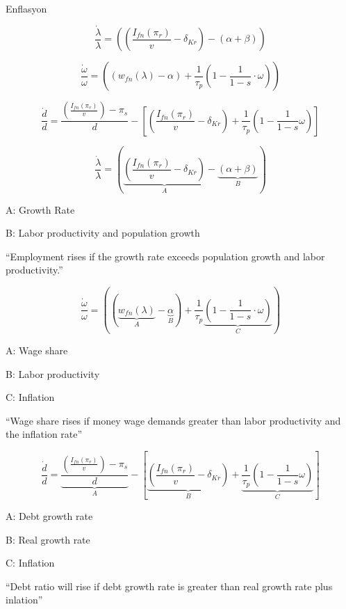 \documentclass[12pt,fleqn]{article}\usepackage{../../common}
\begin{document}
Enflasyon


$$ 
\frac{\dot{\lambda}}{\lambda} =
\left( 
  \left( \frac{I_{fn}(\pi_r)}{v}  - \delta_{Kr} \right) -
  (\alpha + \beta)
\right)
$$

$$ 
\frac{\dot{\omega}}{\omega} = 
\left( 
(w_{fn}(\lambda) - \alpha) + \frac{1}{\tau_p} \left( 1-\frac{1}{1-s} \cdot \omega\right)
\right)
$$


$$ 
\frac{\dot{d}}{d} = 
\frac{\left( \frac{I_{fn}(\pi_r)}{v} \right) - \pi_s }{d} - 
\left[ 
\left( \frac{I_{fn}(\pi_r)}{v} -\delta_{Kr} \right) + 
\frac{1}{\tau_p} \left(1 - \frac{1}{1-s} \omega\right)
\right]
$$





\newpage









$$ 
\frac{\dot{\lambda}}{\lambda} =
\left( 
  \underbrace{ \left( \frac{I_{fn}(\pi_r)}{v}  - \delta_{Kr} \right)}_{A} - 
  \underbrace{ (\alpha + \beta) }_{B}
\right)
$$

A: Growth Rate

B: Labor productivity and population growth

``Employment rises if the growth rate exceeds population growth and labor productivity.''


$$ 
\frac{\dot{\omega}}{\omega} = 
\left( 
(\underbrace{w_{fn}(\lambda)}_{A} - \underbrace{\alpha}_{B}) + \frac{1}{\tau_p}
\underbrace{\left( 1-\frac{1}{1-s} \cdot \omega \right)}_{C}
\right)
$$

A: Wage share 

B: Labor productivity

C: Inflation

``Wage share rises if money wage demands greater than labor productivity and
the inflation rate''



$$ 
\frac{\dot{d}}{d} = 
\underbrace{\frac{\left( \frac{I_{fn}(\pi_r)}{v} \right) - \pi_s }{d}}_{A} - 
\left[ 
\underbrace{\left( \frac{I_{fn}(\pi_r)}{v} -\delta_{Kr} \right) }_{B}+ 
\underbrace{\frac{1}{\tau_p} \left(1 - \frac{1}{1-s} \omega\right)}_{C}
\right]
$$

A: Debt growth rate

B: Real growth rate

C: Inflation

``Debt ratio will rise if debt growth rate is greater than real growth rate
plus inlation''
\end{document}
